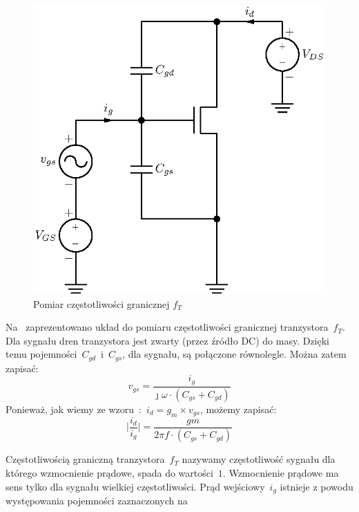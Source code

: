 \documentclass[twoside,pl,final]{labman}
\begin{document}
\begin{figure}[!htbp]
  \centering
  \includegraphics[height=0.25\textheight]{ft_measure}
  \caption{Pomiar częstotliwości granicznej $f_T$}
  \label{fig:ft:meas}
\end{figure}

Na~ zaprezentowano układ do pomiaru
częstotliwości granicznej tranzystora~$f_T$.
Dla sygnału dren tranzystora jest zwarty (przez źródło DC) do masy.
Dzięki temu pojemności~$C_{gd}$~i~$C_{gs}$, dla sygnału, są połączone równolegle.
Można zatem zapisać:
\begin{equation}
  v_{gs} = \frac{i_g}{\jmath \omega \cdot (C_{gs} + C_{gd})}
  \label{eqn:ft:vgs}
\end{equation}
Ponieważ, jak wiemy ze wzoru~:~$i_d = g_m \times v_{gs}$,
możemy zapisać:
\begin{equation}
  \Big \vert \frac{i_d}{i_g} \Big \vert = \frac{gm}{2 \pi f \cdot (C_{gs} + C_{gd})}
  \label{eqn:ft:igain}
\end{equation}

Częstotliwością graniczną tranzystora~$f_T$ nazywamy częstotliwość sygnału
dla którego wzmocnienie prądowe, spada do wartości~$1$.
Wzmocnienie prądowe ma sens tylko dla sygnału wielkiej częstotliwości.
Prąd wejściowy~$i_g$ istnieje z powodu występowania
pojemności zaznaczonych na~
\end{document}
